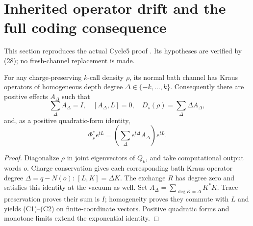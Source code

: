 \section{Inherited operator drift and the full coding consequence}

This section reproduces the actual Cycle5 proof \cite{Cycle5}. Its hypotheses are verified by (28); no fresh-channel replacement is made.

\begin{lemma}\label{lem:grade}
For any charge-preserving $k$-call density $\rho$, its normal bath channel
has Kraus operators of homogeneous depth degree
$\Delta\in\{-k,\ldots,k\}$. Consequently there are positive effects
$A_\Delta$ such that
\[
 \sum_\Delta A_\Delta=I,\quad [A_\Delta,L]=0,\quad
 D_s(\rho)=\sum_\Delta\Delta A_\Delta,
 \tag{C1}
\]
and, as a positive quadratic-form identity,
\[
 \Phi_\rho^*e^{tL}
 =\left(\sum_\Delta e^{t\Delta}A_\Delta\right)e^{tL}.
 \tag{C2}
\]
\end{lemma}
\begin{proof}
Diagonalize $\rho$ in joint eigenvectors of $Q_k$, and take computational
output words $o$. Charge conservation gives each corresponding bath Kraus
operator degree $\Delta=q-N(o)$:
$[L,K]=\Delta K$. The exchange $R$ has degree zero and satisfies this
identity at the vacuum as well. Set $A_\Delta=\sum_{\deg K=\Delta}K^*K$.
Trace preservation proves their sum is $I$; homogeneity proves they commute
with $L$ and yields (C1)--(C2) on finite-coordinate vectors. Positive
quadratic forms and monotone limits extend the exponential identity.
\end{proof}

